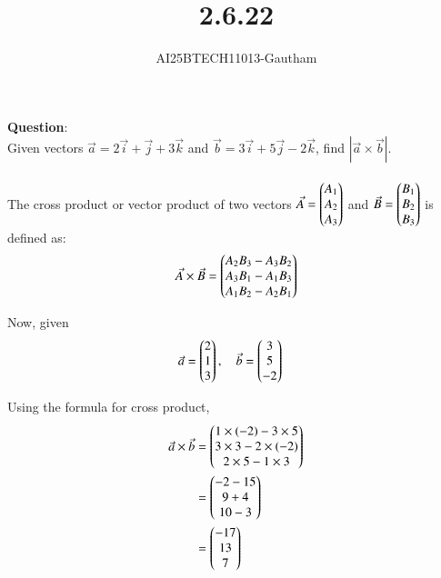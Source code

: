 \documentclass[journal]{IEEEtran}
\begin{document}

\vspace{3cm}

\title{2.6.22}
\author{AI25BTECH11013-Gautham}
 \maketitle
{\let\newpage\relax\maketitle}

\renewcommand{\thefigure}{\theenumi}
\renewcommand{\thetable}{\theenumi}
\setlength{\intextsep}{10pt} %


\renewcommand{\thetable}{\theenumi}     
\textbf{Question}:\\
Given vectors $\Vec{a} = 2\overrightarrow{i} + \overrightarrow{j} + 3\overrightarrow{k}$ and $\Vec{b} = 3\overrightarrow{i} + 5\overrightarrow{j} - 2\overrightarrow{k}$, find $|\Vec{a} \times \Vec{b}|$.\\

\solution \\

The cross product or vector product of two vectors $\Vec{A} = \begin{pmatrix}A_{1} \\ A_{2} \\ A_{3}\end{pmatrix}$ and $\Vec{B} = \begin{pmatrix}B_{1} \\ B_{2} \\ B_{3}\end{pmatrix}$ is defined as:
\begin{align}
\Vec{A} \times \Vec{B} = \begin{pmatrix}
A_{2} B_{3} - A_{3} B_{2}\\
A_{3} B_{1} - A_{1} B_{3} \\
A_{1} B_{2} - A_{2} B_{1}
\end{pmatrix}
\end{align}

Now, given
\begin{align}
\Vec{a} &= \begin{pmatrix}2 \\ 1 \\ 3\end{pmatrix}, \quad
\Vec{b} = \begin{pmatrix}3 \\ 5 \\ -2\end{pmatrix}
\end{align}

Using the formula for cross product,
\begin{align}
\Vec{a} \times \Vec{b} &= \begin{pmatrix}
1 \times (-2) - 3 \times 5 \\
3 \times 3 - 2 \times (-2) \\
2 \times 5 - 1 \times 3
\end{pmatrix} \\
&= \begin{pmatrix}
-2 - 15 \\
9 + 4 \\
10 - 3
\end{pmatrix} \\
&= \begin{pmatrix}-17 \\ 13 \\ 7\end{pmatrix}
\end{align}
\end{document}

